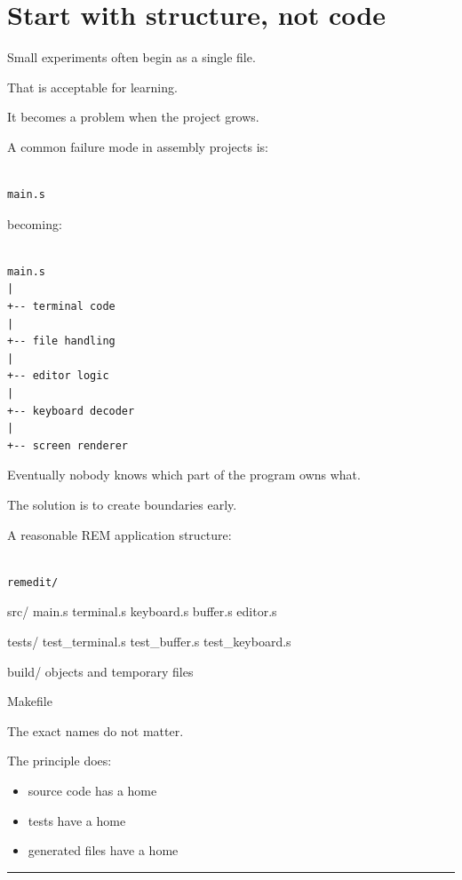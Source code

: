 \documentclass[
  oneside,
  openany]{book}
\providecommand{\tightlist}{%
  \setlength{\itemsep}{0pt}\setlength{\parskip}{0pt}}
\begin{document}
\hypertarget{start-with-structure-not-code}{%
\section{Start with structure, not
code}\label{start-with-structure-not-code}}

Small experiments often begin as a single file.

That is acceptable for learning.

It becomes a problem when the project grows.

A common failure mode in assembly projects is:

\begin{verbatim}

main.s
\end{verbatim}

becoming:

\begin{verbatim}

main.s
|
+-- terminal code
|
+-- file handling
|
+-- editor logic
|
+-- keyboard decoder
|
+-- screen renderer
\end{verbatim}

Eventually nobody knows which part of the program owns what.

The solution is to create boundaries early.

A reasonable REM application structure:

\begin{verbatim}

remedit/
\end{verbatim}

src/ main.s terminal.s keyboard.s buffer.s editor.s

tests/ test\_terminal.s test\_buffer.s test\_keyboard.s

build/ objects and temporary files

Makefile 


The exact names do not matter.

The principle does:

\begin{itemize}
\tightlist
\item
  source code has a home
\item
  tests have a home
\item
  generated files have a home
\end{itemize}

\begin{center}\rule{0.5\linewidth}{0.5pt}\end{center}
\end{document}
